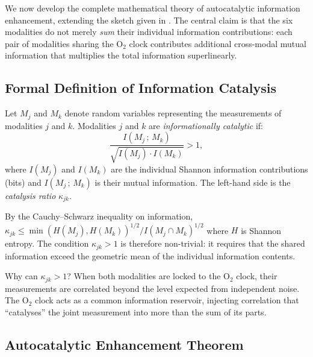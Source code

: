 We now develop the complete mathematical theory of autocatalytic information
enhancement, extending the sketch given in .  The
central claim is that the six modalities do not merely \emph{sum} their
individual information contributions: each pair of modalities sharing the
O$_2$ clock contributes additional cross-modal mutual information that
multiplies the total information superlinearly.

\subsection{Formal Definition of Information Catalysis}
\label{sec:ch06-info-catalysis-def}

\begin{definition}
\label{def:ch06-info-catalysis}
Let $M_j$ and $M_k$ denote random variables representing the measurements
of modalities $j$ and $k$.  Modalities $j$ and $k$ are \emph{informationally
catalytic} if:
\begin{equation}
  \frac{I(M_j\,;\,M_k)}{\sqrt{I(M_j)\cdot I(M_k)}} > 1,
  \label{eq:ch06-info-catalysis-def}
\end{equation}
where $I(M_j)$ and $I(M_k)$ are the individual Shannon information
contributions (bits) and $I(M_j\,;\,M_k)$ is their mutual information.
The left-hand side is the \emph{catalysis ratio} $\kappa_{jk}$.
\end{definition}

\begin{remark}
By the Cauchy--Schwarz inequality on information, $\kappa_{jk} \le
\min(H(M_j),H(M_k))^{1/2} / I(M_j\cap M_k)^{1/2}$ where $H$ is Shannon
entropy.  The condition $\kappa_{jk} > 1$ is therefore non-trivial: it
requires that the shared information exceed the geometric mean of the
individual information contents.
\end{remark}

Why can $\kappa_{jk} > 1$?  When both modalities are locked to the O$_2$
clock, their measurements are correlated beyond the level expected from
independent noise.  The O$_2$ clock acts as a common information reservoir,
injecting correlation that ``catalyses'' the joint measurement into more
than the sum of its parts.

\subsection{Autocatalytic Enhancement Theorem}
\label{sec:ch06-autocatalytic-enhancement}

